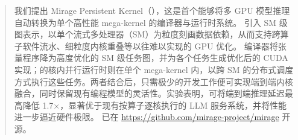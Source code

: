 \begin{abstract}
我们提出 Mirage Persistent Kernel（\sys），这是首个能够将多 GPU 模型推理自动转换为单个高性能 mega-kernel 的编译器与运行时系统。 \Sys 引入 SM 级图表示，以单个流式多处理器（SM）为粒度刻画数据依赖，从而支持跨算子软件流水、细粒度内核重叠等以往难以实现的 GPU 优化。 \sys 编译器将张量程序降为高度优化的 SM 级任务图，并为各个任务生成优化后的 CUDA 实现；\sys 的核内并行运行时则在单个 mega-kernel 内，以跨 SM 的分布式调度方式执行这些任务。两者结合后，只需极少的开发工作便可实现端到端内核融合，同时保留现有编程模型的灵活性。实验表明，\sys 可将端到端推理延迟最高降低 1.7$\times$，显著优于现有按算子逐核执行的 LLM 服务系统，并将性能进一步逼近硬件极限。 \sys 已在 \url{https://github.com/mirage-project/mirage} 开源。
\end{abstract}
